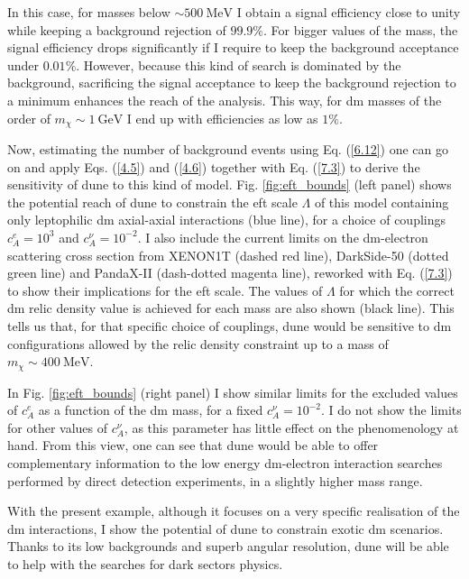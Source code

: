 In this case, for masses below $\sim 500 \ \mathrm{MeV}$ I obtain a signal efficiency close to unity while keeping a background rejection of $99.9\%$. For bigger values of the mass, the signal efficiency drops significantly if I require to keep the background acceptance under $0.01\%$. However, because this kind of search is dominated by the background, sacrificing the signal acceptance to keep the background rejection to a minimum enhances the reach of the analysis. This way, for \gls{dm} masses of the order of $m_{\chi} \sim 1 \ \mathrm{GeV}$ I end up with efficiencies as low as $1\%$.

Now, estimating the number of background events using Eq. (\ref{6.12}) one can go on and apply Eqs. (\ref{4.5}) and (\ref{4.6}) together with Eq. (\ref{7.3}) to derive the sensitivity of \gls{dune} to this kind of model. Fig. \ref{fig:eft_bounds} (left panel) shows the potential reach of \gls{dune} to constrain the \gls{eft} scale $\Lambda$ of this model containing only leptophilic \gls{dm} axial-axial interactions (blue line), for a choice of couplings $c_{A}^{e} = 10^{3}$ and $c_{A}^{\nu} = 10^{-2}$. I also include the current limits on the \gls{dm}-electron scattering cross section from XENON1T \cite{XENON2019} (dashed red line), DarkSide-50 \cite{DarkSide2022} (dotted green line) and PandaX-II \cite{PandaX-II2021} (dash-dotted magenta line), reworked with Eq. (\ref{7.3}) to show their implications for the \gls{eft} scale. The values of $\Lambda$ for which the correct \gls{dm} relic density value is achieved for each mass are also shown (black line). This tells us that, for that specific choice of couplings, \gls{dune} would be sensitive to \gls{dm} configurations allowed by the relic density constraint up to a mass of $m_{\chi} \sim 400 \ \mathrm{MeV}$.

In Fig. \ref{fig:eft_bounds} (right panel) I show similar limits for the excluded values of $c_{A}^{e}$ as a function of the \gls{dm} mass, for a fixed $c_{A}^{\nu}=10^{-2}$. I do not show the limits for other values of $c_{A}^{\nu}$, as this parameter has little effect on the phenomenology at hand. From this view, one can see that \gls{dune} would be able to offer complementary information to the low energy \gls{dm}-electron interaction searches performed by direct detection experiments, in a slightly higher mass range.

With the present example, although it focuses on a very specific realisation of the \gls{dm} interactions, I show the potential of \gls{dune} to constrain exotic \gls{dm} scenarios. Thanks to its low backgrounds and superb angular resolution, \gls{dune} will be able to help with the searches for dark sectors physics.
